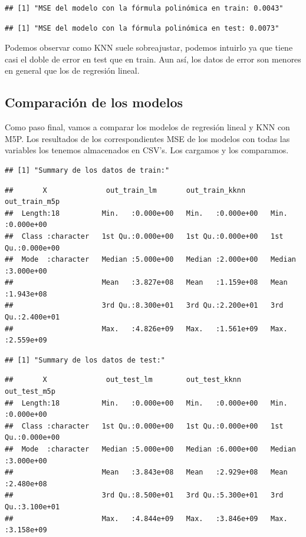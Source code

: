 \documentclass[
]{article}
\begin{document}
\begin{verbatim}
## [1] "MSE del modelo con la fórmula polinómica en train: 0.0043"
\end{verbatim}

\begin{verbatim}
## [1] "MSE del modelo con la fórmula polinómica en test: 0.0073"
\end{verbatim}

Podemos observar como KNN suele sobreajustar, podemos intuirlo ya que
tiene casi el doble de error en test que en train. Aun así, los datos de
error son menores en general que los de regresión lineal.

\hypertarget{comparaciuxf3n-de-los-modelos}{%
\subsection{Comparación de los
modelos}\label{comparaciuxf3n-de-los-modelos}}

Como paso final, vamos a comparar los modelos de regresión lineal y KNN
con M5P. Los resultados de los correspondientes MSE de los modelos con
todas las variables los tenemos almacenados en CSV's. Los cargamos y los
comparamos.

\begin{verbatim}
## [1] "Summary de los datos de train:"
\end{verbatim}

\begin{verbatim}
##       X              out_train_lm       out_train_kknn      out_train_m5p      
##  Length:18          Min.   :0.000e+00   Min.   :0.000e+00   Min.   :0.000e+00  
##  Class :character   1st Qu.:0.000e+00   1st Qu.:0.000e+00   1st Qu.:0.000e+00  
##  Mode  :character   Median :5.000e+00   Median :2.000e+00   Median :3.000e+00  
##                     Mean   :3.827e+08   Mean   :1.159e+08   Mean   :1.943e+08  
##                     3rd Qu.:8.300e+01   3rd Qu.:2.200e+01   3rd Qu.:2.400e+01  
##                     Max.   :4.826e+09   Max.   :1.561e+09   Max.   :2.559e+09
\end{verbatim}

\begin{verbatim}
## [1] "Summary de los datos de test:"
\end{verbatim}

\begin{verbatim}
##       X              out_test_lm        out_test_kknn        out_test_m5p      
##  Length:18          Min.   :0.000e+00   Min.   :0.000e+00   Min.   :0.000e+00  
##  Class :character   1st Qu.:0.000e+00   1st Qu.:0.000e+00   1st Qu.:0.000e+00  
##  Mode  :character   Median :5.000e+00   Median :6.000e+00   Median :3.000e+00  
##                     Mean   :3.843e+08   Mean   :2.929e+08   Mean   :2.480e+08  
##                     3rd Qu.:8.500e+01   3rd Qu.:5.300e+01   3rd Qu.:3.100e+01  
##                     Max.   :4.844e+09   Max.   :3.846e+09   Max.   :3.158e+09
\end{verbatim}
\end{document}
